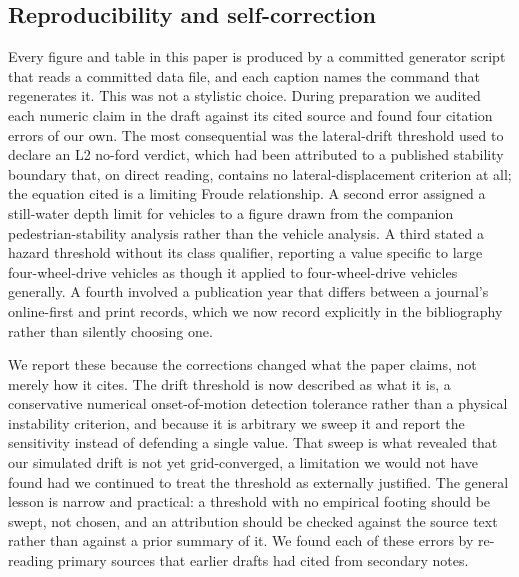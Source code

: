 
\subsection{Reproducibility and self-correction}

Every figure and table in this paper is produced by a committed generator script that
reads a committed data file, and each caption names the command that regenerates it.
This was not a stylistic choice. During preparation we audited each numeric claim in the
draft against its cited source and found four citation errors of our own. The most
consequential was the lateral-drift threshold used to declare an L2 no-ford verdict,
which had been attributed to a published stability boundary that, on direct reading,
contains no lateral-displacement criterion at all; the equation cited is a limiting
Froude relationship. A second error assigned a still-water depth limit for vehicles to a
figure drawn from the companion pedestrian-stability analysis rather than the vehicle
analysis. A third stated a hazard threshold without its class qualifier, reporting a
value specific to large four-wheel-drive vehicles as though it applied to
four-wheel-drive vehicles generally. A fourth involved a publication year that differs
between a journal's online-first and print records, which we now record explicitly in
the bibliography rather than silently choosing one.

We report these because the corrections changed what the paper claims, not merely how it
cites. The drift threshold is now described as what it is, a conservative numerical
onset-of-motion detection tolerance rather than a physical instability criterion, and
because it is arbitrary we sweep it and report the sensitivity instead of defending a
single value. That sweep is what revealed that our simulated drift is not yet
grid-converged, a limitation we would not have found had we continued to treat the
threshold as externally justified. The general lesson is narrow and practical: a
threshold with no empirical footing should be swept, not chosen, and an attribution
should be checked against the source text rather than against a prior summary of it. We
found each of these errors by re-reading primary sources that earlier drafts had cited
from secondary notes.

